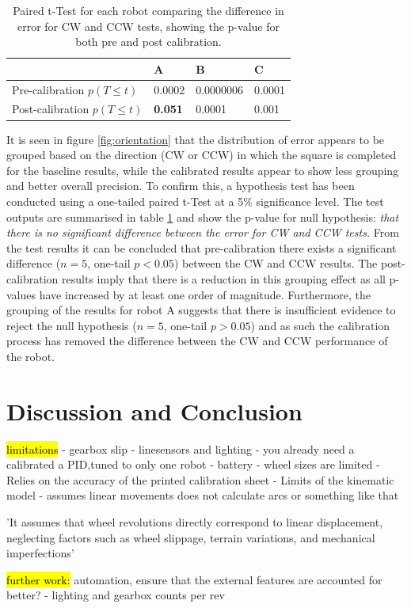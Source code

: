 \documentclass[conference]{IEEEtran}
\begin{document}
\begin{table}[h]
\centering
\caption{Paired t-Test for each robot comparing the difference in error for CW and CCW tests, showing the p-value for both pre and post calibration.}
\label{tab:cw-ccw}
\begin{tabular}{l|l|l|l}
                                  & A      & B      & C      \\ \hline
Pre-calibration $p(T \leq t)$  & 0.0002 & 0.0000006 & 0.0001 \\ \hline
Post-calibration $p(T \leq t)$ & \textbf{0.051}  & 0.0001 & 0.001 
\end{tabular}
\end{table}

It is seen in figure \ref{fig:orientation} that the distribution of error appears to be grouped based on the direction (CW or CCW) in which the square is completed for the baseline results, while the calibrated results appear to show less grouping and better overall precision. To confirm this, a hypothesis test has been conducted using a one-tailed paired t-Test at a 5\% significance level. The test outputs are summarised in table \ref{tab:cw-ccw} and show the p-value for null hypothesis: \emph{that there is no significant difference between the error for CW and CCW tests.} From the test results it can be concluded that pre-calibration there exists a significant difference ($n = 5$, one-tail $p < 0.05$) between the CW and CCW results. The post-calibration results imply that there is a reduction in this grouping effect as all p-values have increased by at least one order of magnitude. Furthermore, the grouping of the results for robot A suggests that there is insufficient evidence to reject the null hypothesis ($n = 5$, one-tail $p > 0.05$) and as such the calibration process has removed the difference between the CW and CCW performance of the robot.



\section{Discussion and Conclusion}\label{sec:discussion_conclusion}

\hl{limitations}
- gearbox slip
- linesensors and lighting
- you already need a calibrated a PID,tuned to only one robot
- battery
- wheel sizes are limited
- Relies on the accuracy of the printed calibration sheet
- Limits of the kinematic model - assumes linear movements does not calculate arcs or something like that

'It assumes that wheel revolutions directly correspond to linear displacement, neglecting factors such as wheel slippage, terrain variations, and mechanical imperfections' \cite{odometry}


\hl{further work:}
automation, ensure that the external features are accounted for better? - lighting and gearbox
counts per rev




 

\end{document}
